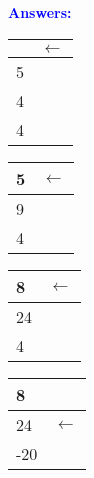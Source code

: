\documentclass{article}
\begin{document}
\begin{enumerate}[label=(\alph*)]
    \textcolor{blue}{\textbf{Answers: }}
    \newline
    \begin{center}
    {\color{blue}
\begin{tabular}{|p{3cm} p{3cm} |} 
\hline
 & $\longleftarrow$ \\
 \hline
 5 & \\
 \hline
 4 & \\
 \hline
 4 & \\
 \hline
\end{tabular} }

{\color{blue}
\begin{tabular}{|p{3cm} p{3cm} |} 
\hline
 5 & $\longleftarrow$ \\
 \hline
 9 & \\
 \hline
 4 & \\
 \hline
\end{tabular} }

{\color{blue}
\begin{tabular}{|p{3cm} p{3cm} |} 
\hline

 8 & $\longleftarrow$\\
 \hline
 24 & \\
 \hline
 4 & \\
 \hline
\end{tabular} }

{\color{blue}
\begin{tabular}{|p{3cm} p{3cm} |} 
\hline

 8 & \\
 \hline
 24 & $\longleftarrow$ \\
 \hline
 -20 & \\
 \hline
\end{tabular} }

\end{center}


\end{enumerate}
\end{document}
